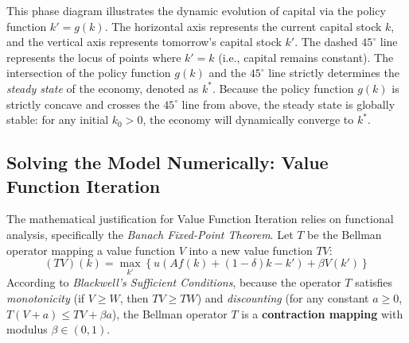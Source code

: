 \begin{center}
\end{center}

This phase diagram illustrates the dynamic evolution of capital via the policy function $k' = g(k)$. The horizontal axis represents the current capital stock $k$, and the vertical axis represents tomorrow's capital stock $k'$. The dashed $45^\circ$ line represents the locus of points where $k' = k$ (i.e., capital remains constant). The intersection of the policy function $g(k)$ and the $45^\circ$ line strictly determines the \textit{steady state} of the economy, denoted as $k^*$. Because the policy function $g(k)$ is strictly concave and crosses the $45^\circ$ line from above, the steady state is globally stable: for any initial $k_0 > 0$, the economy will dynamically converge to $k^*$.

\subsection{Solving the Model Numerically: Value Function Iteration}

The mathematical justification for Value Function Iteration relies on functional analysis, specifically the \textit{Banach Fixed-Point Theorem}. Let $T$ be the Bellman operator mapping a value function $V$ into a new value function $TV$:
\[
    (TV)(k) = \max_{k'} \left\{ u(Af(k) + (1-\delta)k - k') + \beta V(k') \right\}
\]
According to \textit{Blackwell's Sufficient Conditions}, because the operator $T$ satisfies \textit{monotonicity} (if $V \ge W$, then $TV \ge TW$) and \textit{discounting} (for any constant $a \ge 0$, $T(V+a) \le TV + \beta a$), the Bellman operator $T$ is a \textbf{contraction mapping} with modulus $\beta \in (0,1)$. 


